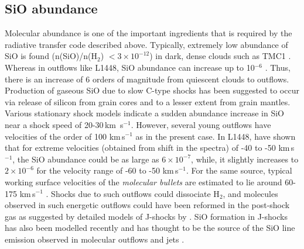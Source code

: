\documentclass[useAMS,usenatbib]{mn2e}
\begin{document}
\subsection{SiO abundance}
\label{ssec:sioabun}
Molecular abundance is one of the important ingredients that is
required by the radiative transfer code described above. 
Typically, extremely low abundance of SiO is
found (n(SiO)/n(H$_{2}$) $< 3\times10^{-12}$) in dark, dense clouds such
as TMC1 \citep{Ziurys:1989p14699,MartinPintado:1992p14309}. Whereas in
outflows like L1448, SiO abundance can increase up to 10$^{-6}$ 
\citep{MartinPintado:1992p14309, Dutrey:1997p11185}. Thus, there is
an increase of 6 orders of magnitude from quiescent clouds
to outflows. Production of
gaseous SiO due to slow C-type shocks has been suggested to occur via release of
silicon from grain cores and to a lesser extent from grain mantles. Various stationary
shock models indicate a sudden abundance increase in SiO 
near a shock speed of 20-30\,km\, s$^{-1}$. However, several young
outflows have velocities of the order of 100 km\,s$^{-1}$ as in the present
case. In L1448, \cite{MartinPintado:1992p14309}
have shown that for extreme velocities (obtained from shift in the
spectra) of -40 to -50 km\,s$^{-1}$, the SiO abundance could be as
large as $6\times10^{-7}$, while, it slightly increases to
$2\times10^{-6}$ for the velocity range of -60 to -50
km\,s$^{-1}$. For the same source, typical working
surface velocities of the {\em{molecular bullets}} are estimated to
lie around 60-175 km\,s$^{-1}$ \cite{Dutrey:1997p11185}.
Shocks due to such outflows could dissociate H$_{2}$, and molecules observed in such
energetic outflows could have been reformed in the post-shock gas as suggested by
detailed models of J-shocks by \cite{Neufeld:1989p14322}. SiO formation in J-shocks
has also been modelled recently and has thought to be the source of
the SiO line emission observed in molecular outflows and jets
\citep{Guillet:2009p11229}.
%
\end{document}
